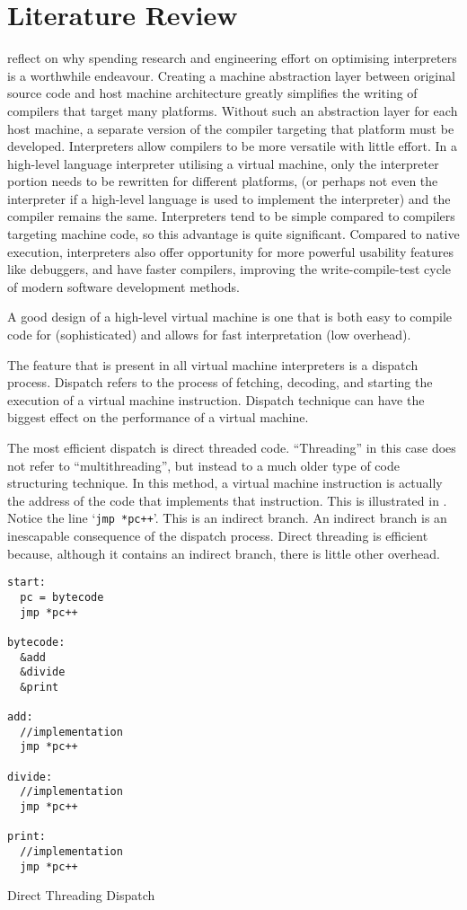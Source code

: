 	\section{Literature Review}
		\cite{structureinterpreters} reflect on why spending research and engineering effort on optimising interpreters is a worthwhile endeavour. Creating a machine abstraction layer between original source code and host machine architecture greatly simplifies the writing of compilers that target many platforms. Without such an abstraction layer for each host machine, a separate version of the compiler targeting that platform must be developed. Interpreters allow compilers to be more versatile with little effort. In a high-level language interpreter utilising a virtual machine, only the interpreter portion needs to be rewritten for different platforms, (or perhaps not even the interpreter if a high-level language is used to implement the interpreter) and the compiler remains the same. Interpreters tend to be simple compared to compilers targeting machine code, so this advantage is quite significant. Compared to native execution, interpreters also offer opportunity for more powerful usability features like debuggers, and have faster compilers, improving the write-compile-test cycle of modern software development methods.
		
		A good design of a high-level virtual machine is one that is both easy to compile code for (sophisticated) and allows for fast interpretation (low overhead).
		
		The feature that is present in all virtual machine interpreters is a dispatch process. Dispatch refers to the process of fetching, decoding, and starting the execution of a virtual machine instruction. Dispatch technique can have the biggest effect on the performance of a virtual machine.
		
		The most efficient dispatch is direct threaded code. ``Threading'' in this case does not refer to ``multithreading'', but instead to a much older type of code structuring technique. In this method, a virtual machine instruction is actually the address of the code that implements that instruction. This is illustrated in . Notice the line `\texttt{jmp *pc++}'. This is an indirect branch. An indirect branch is an inescapable consequence of the dispatch process. Direct threading is efficient because, although it contains an indirect branch, there is little other overhead.
		
		\begin{myfigure}
				\begin{lstlisting}
start:
  pc = bytecode
  jmp *pc++

bytecode:
  &add
  &divide
  &print

add:
  //implementation
  jmp *pc++

divide:
  //implementation
  jmp *pc++

print:
  //implementation
  jmp *pc++

				\end{lstlisting}
				\caption{Direct Threading Dispatch}
				\label{fig:directthreading}
		\end{myfigure}
		
